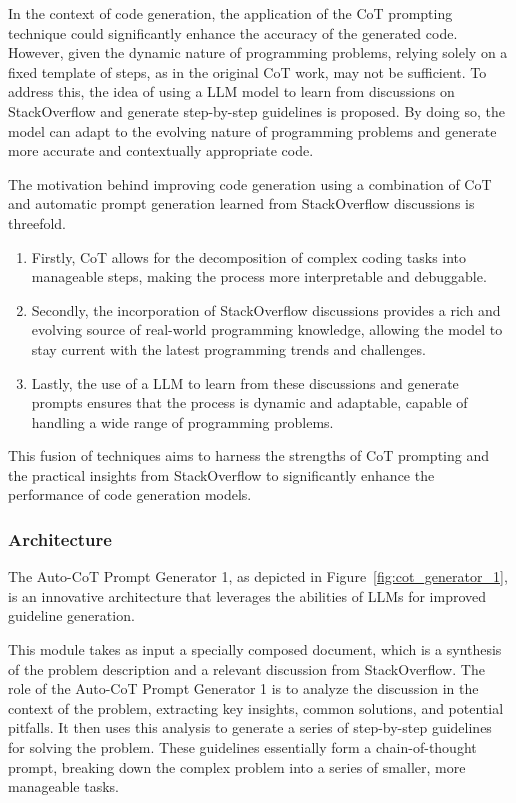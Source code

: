 \documentclass[a4paper,oneside]{book}
\begin{document}
In the context of code generation, the application of the CoT prompting technique could significantly enhance the accuracy of the generated code. However, given the dynamic nature of programming problems, relying solely on a fixed template of steps, as in the original CoT work, may not be sufficient. To address this, the idea of using a LLM model to learn from discussions on StackOverflow and generate step-by-step guidelines is proposed. By doing so, the model can adapt to the evolving nature of programming problems and generate more accurate and contextually appropriate code.

The motivation behind improving code generation using a combination of CoT and automatic prompt generation learned from StackOverflow discussions is threefold.

\begin{enumerate}
    \item Firstly, CoT allows for the decomposition of complex coding tasks into manageable steps, making the process more interpretable and debuggable.
    \item Secondly, the incorporation of StackOverflow discussions provides a rich and evolving source of real-world programming knowledge, allowing the model to stay current with the latest programming trends and challenges.
    \item Lastly, the use of a LLM to learn from these discussions and generate prompts ensures that the process is dynamic and adaptable, capable of handling a wide range of programming problems.
\end{enumerate}

This fusion of techniques aims to harness the strengths of CoT prompting and the practical insights from StackOverflow to significantly enhance the performance of code generation models.

\subsubsection{Architecture}
The Auto-CoT Prompt Generator 1, as depicted in Figure~\ref{fig:cot_generator_1}, is an innovative architecture that leverages the abilities of LLMs for improved guideline generation.

This module takes as input a specially composed document, which is a synthesis of the problem description and a relevant discussion from StackOverflow. The role of the Auto-CoT Prompt Generator 1 is to analyze the discussion in the context of the problem, extracting key insights, common solutions, and potential pitfalls. It then uses this analysis to generate a series of step-by-step guidelines for solving the problem. These guidelines essentially form a chain-of-thought prompt, breaking down the complex problem into a series of smaller, more manageable tasks.
\end{document}
